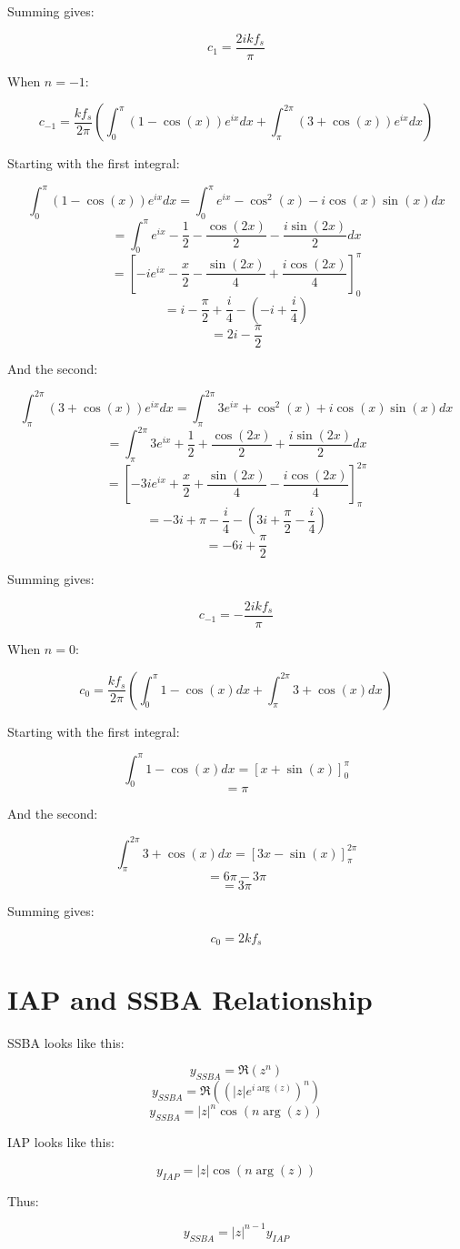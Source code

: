 \documentclass[a4paper]{article}
\begin{document}
	Summing gives:

	\[ \boxed{c_{1} = \frac{2ikf_{s}}{\pi}} \]

	When $n = -1$:

	\[ c_{-1} = \frac{kf_{s}}{2\pi} \left( \int_{0}^{\pi} (1-\cos(x))e^{ix} dx
				              + \int_{\pi}^{2\pi} (3 + \cos(x))e^{ix} dx 
			                      \right) \]

	Starting with the first integral:
	
	\[ \int_{0}^{\pi} (1-\cos(x))e^{ix} dx = \int_{0}^{\pi} e^{ix} - \cos^{2}(x) - i\cos(x)\sin(x) dx \]
	\[ = \int_{0}^{\pi} e^{ix} - \frac{1}{2} - \frac{\cos(2x)}{2} - \frac{i\sin(2x)}{2} dx \]
	\[ = \left[ -ie^{ix} - \frac{x}{2} - \frac{\sin(2x)}{4} + \frac{i\cos(2x)}{4} \right]_{0}^{\pi} \]
	\[ = i - \frac{\pi}{2} + \frac{i}{4} - \left( -i + \frac{i}{4} \right) \]
	\[ = 2i - \frac{\pi}{2} \]

	And the second:
	
	\[ \int_{\pi}^{2\pi} (3+\cos(x))e^{ix} dx = \int_{\pi}^{2\pi} 3e^{ix} + \cos^{2}(x) + i\cos(x)\sin(x) dx \]
	\[ = \int_{\pi}^{2\pi} 3e^{ix} + \frac{1}{2} + \frac{\cos(2x)}{2} + \frac{i\sin(2x)}{2} dx \]
	\[ = \left[ -3ie^{ix} + \frac{x}{2} + \frac{\sin(2x)}{4} - \frac{i\cos(2x)}{4} \right]_{\pi}^{2\pi} \]
	\[ = -3i + \pi - \frac{i}{4} - \left( 3i + \frac{\pi}{2} - \frac{i}{4} \right) \]
	\[ = -6i + \frac{\pi}{2} \]

	Summing gives:

	\[ \boxed{c_{-1} = -\frac{2ikf_{s}}{\pi}} \]

	When $n = 0$:

	\[ c_{0} = \frac{kf_{s}}{2\pi} \left( \int_{0}^{\pi} 1-\cos(x) dx
				              + \int_{\pi}^{2\pi} 3 + \cos(x) dx 
			                      \right) \]

	Starting with the first integral:

	\[ \int_{0}^{\pi} 1 - \cos(x) dx = \left[ x + \sin(x) \right]_{0}^{\pi}\]
	\[ = \pi \]

	And the second:

	\[ \int_{\pi}^{2\pi} 3 + \cos(x) dx = \left[ 3x - \sin(x) \right]_{\pi}^{2\pi}\]
	\[ = 6\pi - 3\pi \]
	\[ = 3\pi \]

	Summing gives:

	\[ \boxed{c_{0} = 2kf_{s}} \]

\section{IAP and SSBA Relationship}
	SSBA looks like this:

	\[ y_{SSBA} = \Re \left( z^{n} \right) \]
	\[ y_{SSBA} = \Re \left( (|z|e^{i\arg(z)})^{n} \right) \]
	\[ y_{SSBA} = |z|^{n}\cos(n\arg(z)) \]

	IAP looks like this:

	\[ y_{IAP} = |z|\cos(n\arg(z)) \]

	Thus:

	\[ \boxed{y_{SSBA} = |z|^{n-1}y_{IAP}} \]
\end{document}
